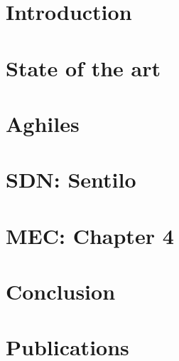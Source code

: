 \documentclass[a4paper, 12pt, twoside,openright]{report}
\begin{document}


%		
%		
%		

	\chapter*{Introduction}
	\minitoc
		

	\chapter{State of the art \cite{bregell_hardware_2015}}
	\minitoc
		
		
		
		
		

	\chapter{Aghiles \cite{bregell_hardware_2015}}
	\minitoc
		
		
		
		
		
		

	\chapter{SDN: Sentilo \cite{_contiki_2016a}}
	\minitoc
		
		
		
		
		
		

	\chapter{MEC: Chapter 4}
	\minitoc
		
		
		
		
		
		
		
	\chapter{Conclusion}
	\minitoc
		
	
	\chapter{Publications}
	\minitoc
		
\end{document}
